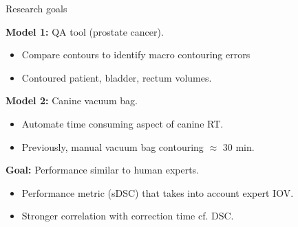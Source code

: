 \documentclass[9pt]{beamer}
\begin{document}
\begin{frame}{Research goals}

\textbf{Model 1:} QA tool (prostate cancer).
\begin{itemize}
\item Compare contours to identify macro contouring errors
\item Contoured patient, bladder, rectum volumes.

\end{itemize}
\vspace{4mm}

\textbf{Model 2:} Canine vacuum bag.
\begin{itemize}
\item Automate time consuming aspect of canine RT.
\item Previously, manual vacuum bag contouring $\approx$ 30 min.
\end{itemize}
\vspace{3mm}

\textbf{Goal:} Performance similar to human experts.
\begin{itemize}
\item Performance metric (sDSC) that takes into account expert IOV.\footnotemark[4]
\item Stronger correlation with correction time cf. DSC.\footnotemark[5]
\end{itemize}
\end{frame}

\end{document}
